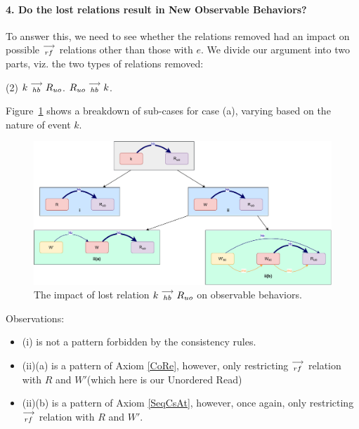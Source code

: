 \paragraph{4. Do the lost relations result in New Observable Behaviors?}

        To answer this, we need to see whether the relations removed had an impact on possible $\stackrel{\longrightarrow}{_{rf}}$ relations other than those with $e$. 
        We divide our argument into two parts, viz. the two types of relations removed:
        \begin{tasks}(2)
            \task $k\stackrel{\longrightarrow}{_{hb}}R_{uo}$. 
            \task $R_{uo}\stackrel{\longrightarrow}{_{hb}}k$.
        \end{tasks}

        Figure~\ref{elim_read:case1} shows a breakdown of sub-cases for case (a), varying based
        on the nature of event $k$.
        \begin{figure}[H]
            \centering
            \includegraphics[scale=0.5]{5.Elimination/1.ValidEliminationCandidate/ReadElimProof/ProofParts/Part4_Case1.pdf}
            \caption{The impact of lost relation $k\stackrel{\longrightarrow}{_{hb}}R_{uo}$ on observable behaviors.}
            \label{elim_read:case1}
        \end{figure}

        Observations:
        \begin{itemize}
            \item (i) is not a pattern forbidden by the consistency rules.
            \item (ii)(a) is a pattern of Axiom \ref{CoRe}, however, only restricting $\stackrel{\longrightarrow}{_{rf}}$ relation with $R$ and $W'$(which here is our Unordered Read)
            \item (ii)(b) is a pattern of Axiom \ref{SeqCsAt}, however, once again, only restricting $\stackrel{\longrightarrow}{_{rf}}$ relation with $R$ and $W'$. 
        \end{itemize}

